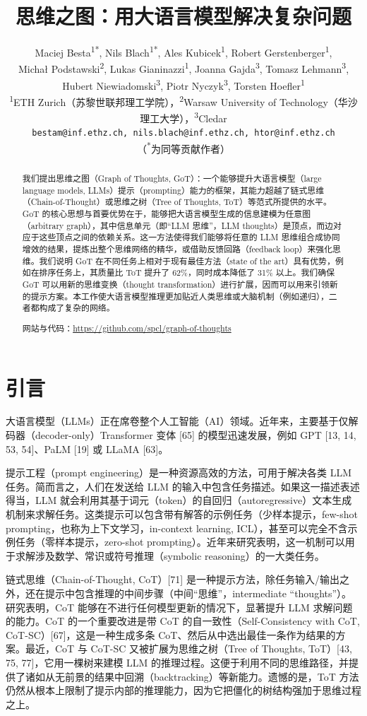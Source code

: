 \documentclass[11pt,UTF8,fontset=fandol]{ctexart}
\title{\textbf{思维之图：用大语言模型解决复杂问题}}
\author{Maciej Besta\textsuperscript{1*}, Nils Blach\textsuperscript{1*}, Ales Kubicek\textsuperscript{1}, Robert Gerstenberger\textsuperscript{1},\\
Michał Podstawski\textsuperscript{2}, Lukas Gianinazzi\textsuperscript{1}, Joanna Gajda\textsuperscript{3}, Tomasz Lehmann\textsuperscript{3},\\
Hubert Niewiadomski\textsuperscript{3}, Piotr Nyczyk\textsuperscript{3}, Torsten Hoefler\textsuperscript{1}\\[0.4em]
\textsuperscript{1}ETH Zurich（苏黎世联邦理工学院），\textsuperscript{2}Warsaw University of Technology（华沙理工大学），\textsuperscript{3}Cledar\\
\texttt{bestam@inf.ethz.ch, nils.blach@inf.ethz.ch, htor@inf.ethz.ch}\\[0.3em]
\small（\textsuperscript{*}为同等贡献作者）}
\date{}
\begin{document}
\maketitle

\begin{abstract}
我们提出思维之图（Graph of Thoughts, GoT）：一个能够提升大语言模型（large language models, LLMs）提示（prompting）能力的框架，其能力超越了链式思维（Chain-of-Thought）或思维之树（Tree of Thoughts, ToT）等范式所提供的水平。GoT 的核心思想与首要优势在于，能够把大语言模型生成的信息建模为任意图（arbitrary graph），其中信息单元（即“LLM 思维”，LLM thoughts）是顶点，而边对应于这些顶点之间的依赖关系。这一方法使得我们能够将任意的 LLM 思维组合成协同增效的结果，提炼出整个思维网络的精华，或借助反馈回路（feedback loop）来强化思维。我们说明 GoT 在不同任务上相对于现有最佳方法（state of the art）具有优势，例如在排序任务上，其质量比 ToT 提升了 62\%，同时成本降低了 31\% 以上。我们确保 GoT 可以用新的思维变换（thought transformation）进行扩展，因而可以用来引领新的提示方案。本工作使大语言模型推理更加贴近人类思维或大脑机制（例如递归），二者都构成了复杂的网络。

\vspace{0.5em}
\noindent 网站与代码：\url{https://github.com/spcl/graph-of-thoughts}
\end{abstract}

\section{引言}

大语言模型（LLMs）正在席卷整个人工智能（AI）领域。近年来，主要基于仅解码器（decoder-only）Transformer 变体 [65] 的模型迅速发展，例如 GPT [13, 14, 53, 54]、PaLM [19] 或 LLaMA [63]。

提示工程（prompt engineering）是一种资源高效的方法，可用于解决各类 LLM 任务。简而言之，人们在发送给 LLM 的输入中包含任务描述。如果这一描述表述得当，LLM 就会利用其基于词元（token）的自回归（autoregressive）文本生成机制来求解任务。这类提示可以包含带有解答的示例任务（少样本提示，few-shot prompting，也称为上下文学习，in-context learning, ICL），甚至可以完全不含示例任务（零样本提示，zero-shot prompting）。近年来研究表明，这一机制可以用于求解涉及数学、常识或符号推理（symbolic reasoning）的一大类任务。

链式思维（Chain-of-Thought, CoT）[71] 是一种提示方法，除任务输入/输出之外，还在提示中包含推理的中间步骤（中间“思维”，intermediate “thoughts”）。研究表明，CoT 能够在不进行任何模型更新的情况下，显著提升 LLM 求解问题的能力。CoT 的一个重要改进是带 CoT 的自一致性（Self-Consistency with CoT, CoT-SC）[67]，这是一种生成多条 CoT、然后从中选出最佳一条作为结果的方案。最近，CoT 与 CoT-SC 又被扩展为思维之树（Tree of Thoughts, ToT）[43, 75, 77]，它用一棵树来建模 LLM 的推理过程。这便于利用不同的思维路径，并提供了诸如从无前景的结果中回溯（backtracking）等新能力。遗憾的是，ToT 方法仍然从根本上限制了提示内部的推理能力，因为它把僵化的树结构强加于思维过程之上。
\end{document}
